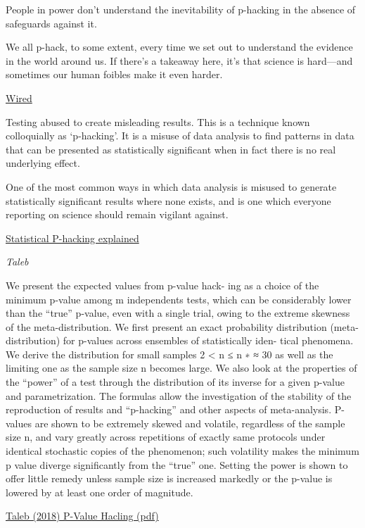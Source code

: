 \documentclass[
]{book}
\begin{document}
People in power don't understand the inevitability of p-hacking in the absence of safeguards against it.

We all p-hack, to some extent, every time we set out to understand the evidence in the world around us. If there's a takeaway here, it's that science is hard---and sometimes our human foibles make it even harder.

\href{https://www.wired.com/story/were-all-p-hacking-now/}{Wired}

Testing abused to create misleading results. This is a technique known colloquially as `p-hacking'. It is a misuse of data analysis to find patterns in data that can be presented as statistically significant when in fact there is no real underlying effect.

One of the most common ways in which data analysis is misused to generate statistically significant results where none exists, and is one which everyone reporting on science should remain vigilant against.

\href{https://scienceinthenewsroom.org/resources/statistical-p-hacking-explained/}{Statistical P-hacking explained}

\emph{Taleb}

We present the expected values from p-value hack-
ing as a choice of the minimum p-value among m independents
tests, which can be considerably lower than the ``true'' p-value,
even with a single trial, owing to the extreme skewness of the
meta-distribution.
We first present an exact probability distribution (meta-
distribution) for p-values across ensembles of statistically iden-
tical phenomena. We derive the distribution for small samples
2 \textless{} n ≤ n ∗ ≈ 30 as well as the limiting one as the sample size n
becomes large. We also look at the properties of the ``power'' of
a test through the distribution of its inverse for a given p-value
and parametrization.
The formulas allow the investigation of the stability of the
reproduction of results and ``p-hacking'' and other aspects of
meta-analysis.
P-values are shown to be extremely skewed and volatile,
regardless of the sample size n, and vary greatly across repetitions
of exactly same protocols under identical stochastic copies of the
phenomenon; such volatility makes the minimum p value diverge
significantly from the ``true'' one. Setting the power is shown to
offer little remedy unless sample size is increased markedly or
the p-value is lowered by at least one order of magnitude.

\href{pdf/Taleb_2018_P-Value-Hacking.pdf}{Taleb (2018) P-Value Hacling (pdf)}
\end{document}
